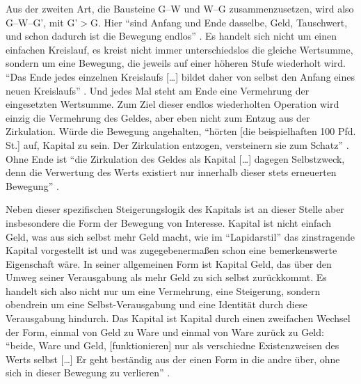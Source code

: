 \documentclass[12pt,
               DIV13,
               paper=a4,
               twoside=false,
               onehalfspacing,
               bibliography=totoc,
               toc=graduated,
               draft,
               ]{scrartcl}
\newcommand{\lips}{\dots\unkern}
\newcommand{\pc}[2]{\parencite[#1]{#2}}
\newcommand{\gwg}{G--W--G'\xspace}
\begin{document}

Aus der zweiten Art, die Bausteine G--W und W--G zusammenzusetzen,
wird also \gwg, mit G'$>$G. Hier "`sind Anfang und Ende dasselbe,
Geld, Tauschwert, und schon dadurch ist die Bewegung endlos"'
\pc{166}{kap}. Es handelt sich nicht um einen einfachen Kreislauf, es
kreist nicht immer unterschiedslos die gleiche Wertsumme, sondern um
eine Bewegung, die jeweils auf einer höheren Stufe wiederholt wird.
"`Das Ende jedes einzelnen Kreislaufs [\lips] bildet daher von selbst
den Anfang eines neuen Kreislaufs"' \pc{S. 166 f.}{kap}. Und jedes Mal
steht am Ende eine Vermehrung der eingesetzten Wertsumme. Zum Ziel
dieser endlos wiederholten Operation wird einzig die Vermehrung des
Geldes, aber eben nicht zum Entzug aus der Zirkulation. Würde die
Bewegung angehalten, "`hörten [die beispielhaften 100 Pfd. St.] auf,
Kapital zu sein. Der Zirkulation entzogen, versteinern sie zum
Schatz"' \pc{166}{kap}. Ohne Ende ist "`die Zirkulation des Geldes als
Kapital [\lips] dagegen Selbstzweck, denn die Verwertung des Werts
existiert nur innerhalb dieser stets erneuerten Bewegung"'
\pc{167}{kap}.




Neben dieser spezifischen Steigerungslogik des Kapitals ist an dieser
Stelle aber insbesondere die Form der Bewegung von Interesse. Kapital
ist nicht einfach Geld, was aus sich selbst mehr Geld macht, wie im
"`Lapidarstil"' \pc{170}{kap} das zinstragende Kapital vorgestellt ist
und was zugegebenermaßen schon eine bemerkenswerte Eigenschaft wäre.
In seiner allgemeinen Form ist Kapital Geld, das über den Umweg seiner
Verausgabung als mehr Geld zu sich selbst zurückkommt. Es handelt sich
also nicht nur um eine Vermehrung, eine Steigerung, sondern obendrein
um eine Selbst-Verausgabung und eine Identität durch diese
Verausgabung hindurch. Das Kapital ist Kapital durch einen zweifachen
Wechsel der Form, einmal von Geld zu Ware und einmal von Ware zurück
zu Geld: "`beide, Ware und Geld, [funktionieren] nur als verschiedne
Existenzweisen des Werts selbst [\lips] Er geht beständig aus der
einen Form in die andre über, ohne sich in dieser Bewegung zu
verlieren"' \pc{S. 168 f.}{kap}.
\end{document}

